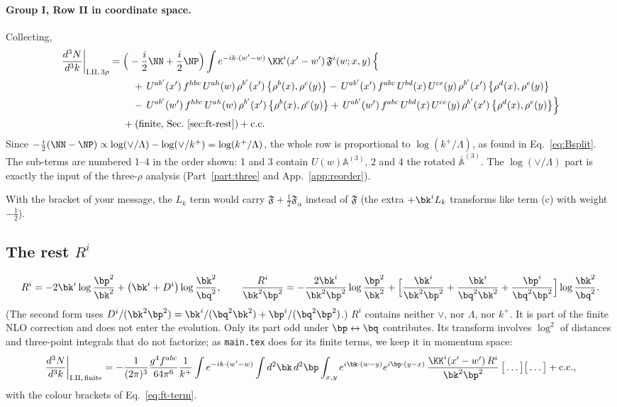\paragraph{Group I, Row II in coordinate space.} Collecting,
\begin{align}
\frac{d^3N}{d^3k}\bigg|_{\rm I.II,\,3\rho}={}&\Big(-\frac i2\NN+\frac i2\NP\Big)\int e^{-ik\cdot(w'-w)}\,\KK^i(x'-w')\,\mathfrak F^i(w;x,y)\,\Big\{\notag\\
&\quad +\,U^{ab'}(x')\,f^{hbc}\,U^{ah}(w)\,\rho^{b'}(x')\,\big\{\rho^{b}(x),\rho^{c}(y)\big\}
-\,U^{ab'}(x')\,f^{abc}\,U^{bd}(x)\,U^{ce}(y)\,\rho^{b'}(x')\,\big\{\rho^{d}(x),\rho^{e}(y)\big\}\notag\\
&\quad -\,U^{ab'}(w')\,f^{hbc}\,U^{ah}(w)\,\rho^{b'}(x')\,\big\{\rho^{b}(x),\rho^{c}(y)\big\}
+\,U^{ab'}(w')\,f^{abc}\,U^{bd}(x)\,U^{ce}(y)\,\rho^{b'}(x')\,\big\{\rho^{d}(x),\rho^{e}(y)\big\}\Big\}\notag\\
&+(\text{finite, Sec.~\ref{sec:ft-rest}})+{\rm c.c.}
\label{eq:RowIIcoord}
\end{align}
Since $-\frac i2(\NN-\NP)\propto\log(\vee/\Lambda)-\log(\vee/k^+)=\log(k^+/\Lambda)$, the whole row is proportional to $\log(k^+/\Lambda)$, as found in Eq.~\eqref{eq:Bsplit}. The sub-terms are numbered 1--4 in the order shown: 1 and 3 contain $U(w)\mathbb A^{(3)}$, 2 and 4 the rotated $\bar{\mathbb A}^{(3)}$. The $\log(\vee/\Lambda)$ part is exactly the input of the three-$\rho$ analysis (Part~\ref{part:three} and App.~\ref{app:reorder}).

With the bracket of your message, the $L_k$ term would carry $\mathfrak F+\frac12\mathfrak F_\alpha$ instead of $\mathfrak F$ (the extra $+\bk^iL_k$ transforms like term (c) with weight $-\frac12$).

\subsection{The rest \texorpdfstring{$R^i$}{R}}\label{sec:ft-rest}
\begin{equation}
R^i=-2\bk^i\log\frac{\bp^2}{\bk^2}+\big(\bk^i+D^i\big)\log\frac{\bk^2}{\bq^2},\qquad
\frac{R^i}{\bk^2\bp^2}=-\frac{2\bk^i}{\bk^2\bp^2}\log\frac{\bp^2}{\bk^2}+\Big[\frac{\bk^i}{\bk^2\bp^2}+\frac{\bk^i}{\bq^2\bk^2}+\frac{\bp^i}{\bq^2\bp^2}\Big]\log\frac{\bk^2}{\bq^2}.
\end{equation}
(The second form uses $D^i/(\bk^2\bp^2)=\bk^i/(\bq^2\bk^2)+\bp^i/(\bq^2\bp^2)$.) $R^i$ contains neither $\vee$, nor $\Lambda$, nor $k^+$. It is part of the finite NLO correction and does not enter the evolution. Only its part odd under $\bp\leftrightarrow\bq$ contributes. Its transform involves $\log^2$ of distances and three-point integrals that do not factorize; as \texttt{main.tex} does for its finite terms, we keep it in momentum space:
\begin{equation}
\frac{d^3N}{d^3k}\bigg|_{\rm I.II,\,finite}=-\frac{1}{(2\pi)^3}\frac{g^4f^{abc}}{64\pi^6}\frac1{k^+}\int e^{-ik\cdot(w'-w)}\int d^2\bk\,d^2\bp\int_{x,y}e^{i\bk\cdot(w-y)}e^{i\bp\cdot(y-x)}\,\frac{\KK^i(x'-w')\,R^i}{\bk^2\bp^2}\,\big[\dots\big]\big[\dots\big]+{\rm c.c.},
\end{equation}
with the colour brackets of Eq.~\eqref{eq:ft-term}.

